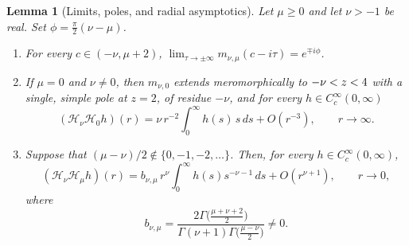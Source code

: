 \documentclass[11pt,a4paper,reqno,backref=page]{amsart}
\newcommand{\HH}{\mathcal H}                 %
\newcommand{\dd}{\,d}
\let\Re\relax\DeclareMathOperator{\Re}{Re}
\numberwithin{equation}{section}
\newtheorem{lemma}[theorem]{Lemma}
\theoremstyle{definition}
\theoremstyle{remark}
\begin{document}
\begin{lemma}[Limits, poles, and radial asymptotics]
\label{lem:sing}
Let $\mu\ge0$ and let $\nu>-1$ be real. Set
$\phi=\frac\pi2(\nu-\mu)$.
\begin{enumerate}
\item[(i)] For every $c\in(-\nu,\mu+2)$,
           $\displaystyle\lim_{\tau\to\pm\infty}
           m_{\nu,\mu}(c-i\tau)
           =e^{\mp i\phi}$.
\item[(ii)] If $\mu=0$ and $\nu\ne0$, then $m_{\nu,0}$ extends
            meromorphically to $-\nu<\Re z<4$ with a single,
            simple pole at $z=2$, of residue $-\nu$, and for
            every $h\in C_c^\infty(0,\infty)$
\begin{equation}\label{eq:tail}
  (\HH_\nu\HH_0h)(r)=\nu\,r^{-2}\int_0^\infty h(s)\,s\dd
  s+O(r^{-3}),
  \qquad r\to\infty.
\end{equation}
\item[(iii)] Suppose that $(\mu-\nu)/2\notin\{0,-1,-2,\ldots\}$.
             Then, for every $h\in C_c^\infty(0,\infty)$,
\begin{equation}\label{eq:origin-asymptotic}
  (\HH_\nu\HH_\mu h)(r)
  =b_{\nu,\mu}\,r^\nu\int_0^\infty h(s)s^{-\nu-1}\dd s
  +O(r^{\nu+1}),
  \qquad r\to0,
\end{equation}
where
\begin{equation}\label{eq:origin-coefficient}
  b_{\nu,\mu}
  =\frac{2\Gamma\bigl(\frac{\mu+\nu+2}{2}\bigr)}
  {\Gamma(\nu+1)\Gamma\bigl(\frac{\mu-\nu}{2}\bigr)}\ne0.
\end{equation}
\end{enumerate}
\end{lemma}
\end{document}
